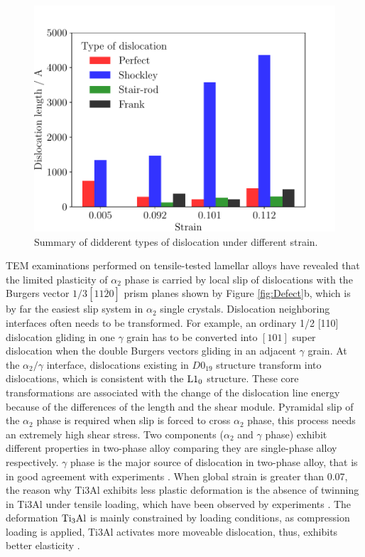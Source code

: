 \documentclass[materials,article,accept,moreauthors,pdftex,10pt,a4paper]{Definitions/mdpi}
\begin{document}
\begin{figure}[H]
\centering
\includegraphics[width=0.5\linewidth]{img/dis-summary}
\caption{Summary of didderent types of dislocation under different strain.}
\label{fig:disum}
\end{figure}

TEM examinations performed on tensile-tested lamellar alloys have revealed that the limited plasticity of  $\alpha_2$ phase is carried by local slip of dislocations with the Burgers vector $1/3[11\overline{2}0]$ prism planes shown by Figure \ref{fig:Defect}b, which is by far the easiest slip system in $\alpha_2$ single crystals.  Dislocation neighboring interfaces often needs to be transformed. For example, an ordinary 1/2 [110] dislocation gliding in one $\gamma$ grain has to be converted into $[101]$ super dislocation when the double Burgers vectors gliding in an adjacent $\gamma$ grain. At the $\alpha_2/\gamma$ interface, dislocations existing in  $D0_{19}$ structure  transform into dislocations, which is consistent with the $\rm{L1_0}$ structure. These core transformations are associated with the change of the dislocation line energy because of the differences of the length and the shear module.  Pyramidal slip of the $\alpha_2$ phase is required  when slip is forced to cross $\alpha_2$ phase, this process needs an extremely high shear stress. Two components ($\alpha_2$ and $\gamma$ phase) exhibit different properties in two-phase alloy comparing they are single-phase alloy respectively. $\gamma$ phase is the major source of dislocation in two-phase alloy, that is in good agreement with experiments \cite{Appel1998a,Singh2006}. When global strain is greater than 0.07, the reason why Ti3Al exhibits less plastic deformation is the absence of twinning in Ti3Al under tensile loading, which have been observed by experiments \cite{sastry1980plastic}. The deformation $\rm{Ti_3Al}$ is mainly constrained by loading conditions, as compression loading is applied, Ti3Al activates more moveable dislocation, thus, exhibits better elasticity \cite{intro-structure}.
\end{document}
